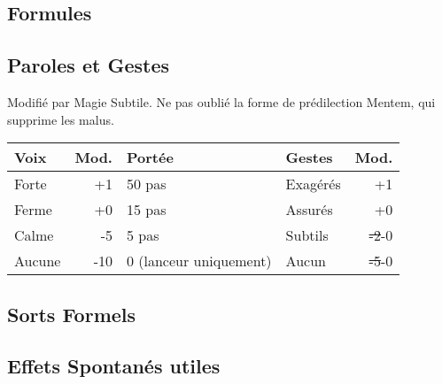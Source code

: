 \magusArtsLong

\subsection*{Formules}
\begin{multicols}{2}
\castingformulas

\begin{small}
\end{small}

\end{multicols}
\subsection*{Paroles et Gestes}
Modifié par Magie Subtile. Ne pas oublié la forme de prédilection Mentem, qui supprime les malus.

\begin{tabularx}{\textwidth}{|X|r|l||X|r|}
\hline
Voix   & Mod. & Portée                          & Gestes   & Mod. \\ \hline
Forte  &  +1  & 50 pas                          & Exagérés & +1 \\
Ferme  &  +0  & 15 pas                          & Assurés  & +0 \\
Calme  &  -5  & 5 pas                           & Subtils  & \sout{-2}-0 \\
Aucune & -10  & 0 {\small (lanceur uniquement)} & Aucun    & \sout{-5}-0 \\ \hline
\end{tabularx}

\subsection*{Sorts Formels}
\begin{multicols}{2}


\longspells
\end{multicols}
\subsection*{Effets Spontanés utiles}




